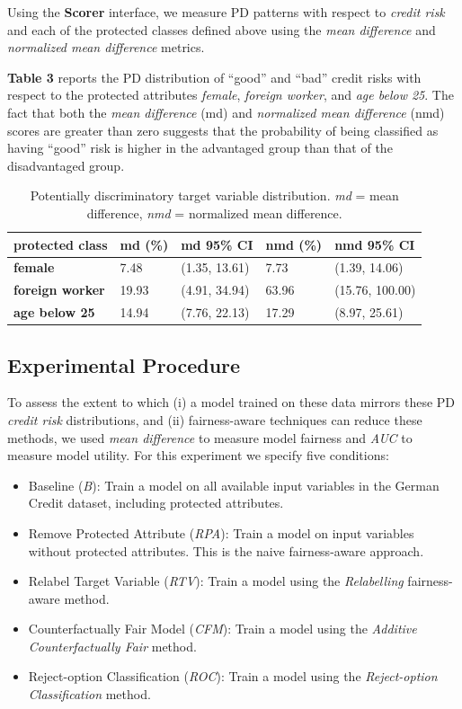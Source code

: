 \documentclass{acm_proc_article-sp}
\begin{document}
Using the \textbf{Scorer} interface, we measure PD patterns with respect to
\emph{credit risk} and each of the protected classes defined above using the
\emph{mean difference} and \emph{normalized mean difference} metrics.

\textbf{Table 3} reports the PD distribution of ``good'' and ``bad'' credit
risks with respect to the protected attributes \emph{female}, \emph{foreign
worker}, and \emph{age below 25}. The fact that both the \emph{mean difference}
(md) and \emph{normalized mean difference} (nmd) scores are greater than zero
suggests that the probability of being classified as having ``good'' risk is
higher in the advantaged group than that of the disadvantaged group.

\begin{table}
  \caption{Potentially discriminatory target variable distribution.
    \emph{md} = mean difference, \emph{nmd} = normalized mean difference.}
  \renewcommand{\arraystretch}{1.75}
  \small\noindent\begin{tabularx}{\linewidth}{l|X|X|X|X}
    \textbf{protected class} & \textbf{md (\%)} & \textbf{md 95\% CI} &
      \textbf{nmd (\%)} & \textbf{nmd 95\% CI}\\
    \hline
    \textbf{female} & 7.48 & (1.35, 13.61) & 7.73 & (1.39, 14.06) \\
    \textbf{foreign worker} & 19.93 & (4.91, 34.94) & 63.96 & (15.76, 100.00)\\
    \textbf{age below 25} & 14.94 & (7.76, 22.13) & 17.29 & (8.97, 25.61)\\
  \end{tabularx}
\end{table}

\subsection{Experimental Procedure}

To assess the extent to which (i) a model trained on these data mirrors these PD
\emph{credit risk} distributions, and (ii) fairness-aware techniques can reduce
these methods, we used \emph{mean difference} to measure model fairness and
\emph{AUC} to measure model utility. For this experiment we specify five
conditions:

\begin{itemize}
  \item Baseline (\emph{B}): Train a model on all available input variables in
        the German Credit dataset, including protected attributes.
  \item Remove Protected Attribute (\emph{RPA}): Train a model on input variables
        without protected attributes. This is the naive fairness-aware approach.
  \item Relabel Target Variable (\emph{RTV}): Train a model using the
        \emph{Relabelling} fairness-aware method.
  \item Counterfactually Fair Model (\emph{CFM}): Train a model using the
        \emph{Additive Counterfactually Fair} method.
  \item Reject-option Classification (\emph{ROC}): Train a model using the
        \emph{Reject-option Classification} method.
\end{itemize}
\end{document}
